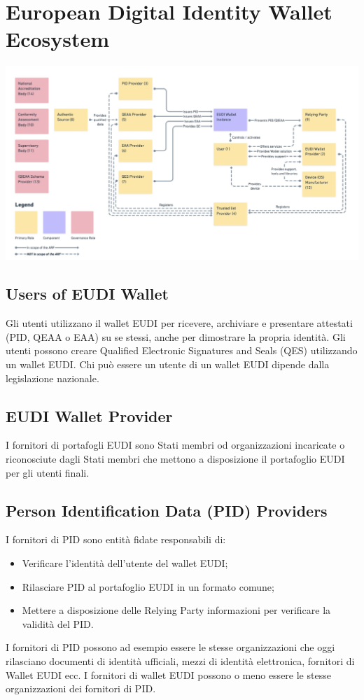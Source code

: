 \section{European Digital Identity Wallet Ecosystem}
\includegraphics[width=\textwidth]{res/images/EcosistemaEUDI.jpg}
\subsection{Users of EUDI Wallet}
Gli utenti utilizzano il wallet\glo{} EUDI per ricevere, archiviare e presentare attestati (PID, QEAA o EAA) su se stessi, anche per dimostrare la propria identità.
Gli utenti possono creare Qualified Electronic Signatures and Seals (QES) utilizzando un wallet EUDI.
Chi può essere un utente di un wallet EUDI dipende dalla legislazione nazionale.
\subsection{EUDI Wallet Provider}
I fornitori di portafogli EUDI sono Stati membri od organizzazioni incaricate o riconosciute dagli Stati membri che mettono a disposizione il portafoglio EUDI per gli utenti finali.
\subsection{Person Identification Data (PID) Providers}
I fornitori di PID sono entità fidate responsabili di:
\begin{itemize}
    \item Verificare l'identità dell'utente del wallet EUDI;
    \item Rilasciare PID al portafoglio EUDI in un formato comune;
    \item Mettere a disposizione delle Relying Party informazioni per verificare la validità del PID.
\end{itemize}
I fornitori di PID possono ad esempio essere le stesse organizzazioni che oggi rilasciano documenti di identità ufficiali, mezzi di identità elettronica, fornitori di Wallet EUDI ecc. I fornitori di wallet EUDI possono o meno essere le stesse organizzazioni dei fornitori di PID.

